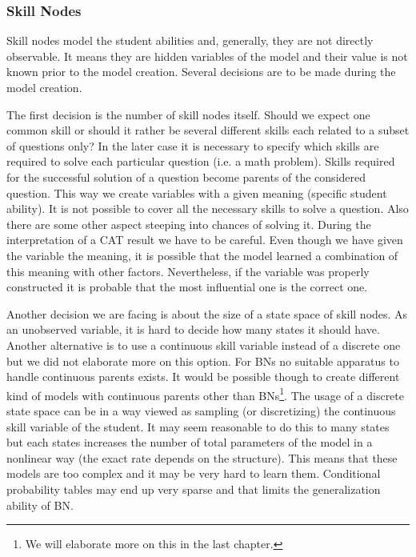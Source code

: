 \subsubsection{Skill Nodes}
Skill nodes model the student abilities and, generally, they are not directly observable. It means they are hidden variables of the model and their value is not known prior to the model creation. Several decisions are to be made during the model creation.
 
The first decision is the number of skill nodes itself. Should we expect one common skill or should it rather be several different skills each related to a subset of questions only? In the later case it is necessary to specify which skills are required to solve each particular question (i.e. a math problem). 
Skills required for the successful solution of a question become parents of the considered question. This way we create variables with a given meaning (specific student ability). It is not possible to cover all the necessary skills to solve a question. Also there are some other aspect steeping into chances of solving it. During the interpretation of a CAT result we have to be careful. Even though we have given the variable the meaning, it is possible that the model learned a combination of this meaning with other factors. Nevertheless, if the variable was properly constructed it is probable that the most influential one is the correct one.

Another decision we are facing is about the size of a state space of skill nodes. As an unobserved variable, it is hard to decide how many states it should have. Another alternative is to use a continuous skill variable instead of a discrete one but we did not elaborate more 
on this option. For BNs no suitable apparatus to handle continuous parents exists. It would be possible though to create different kind of models with continuous parents other than BNs\footnote{We will elaborate more on this in the last chapter.}. The usage of a discrete state space can be in a way viewed as sampling (or discretizing) the continuous skill variable of the student. It may seem reasonable to do this to many states but each states increases the number of total parameters of the model in a nonlinear way (the exact rate depends on the structure). This means that these models are too complex and it may be very hard to learn them. Conditional probability tables may end up very sparse and that limits the generalization ability of BN. 

